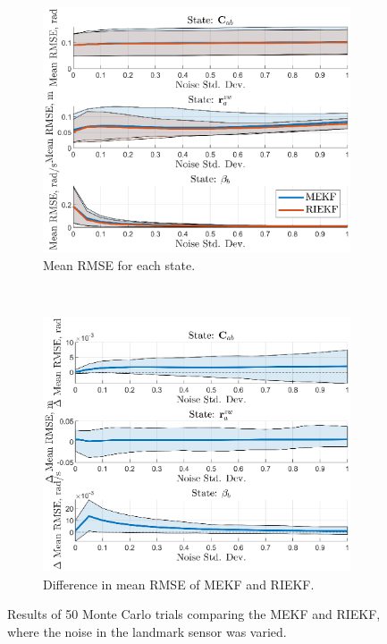 \begin{figure}
	\centering
	\begin{subfigure}[b]{0.5\textwidth}
		\includegraphics[width=\textwidth]{figs/se3/bias/comp_noise_rmse_state_Bias_Corr_R.eps}
		\caption{Mean RMSE for each state.}
	\end{subfigure}
	~
	\begin{subfigure}[b]{0.5\textwidth}
		\includegraphics[width=\textwidth]{figs/se3/bias/comp_noise_diff_state_Bias_Corr_R.eps}
		\caption{Difference in mean RMSE of MEKF and RIEKF.}
	\end{subfigure}
	\caption[Results comparing the MEKF-R and RIEKF varying landmark sensor noise.]{Results of 50 Monte Carlo trials comparing the MEKF and RIEKF, where the noise in the landmark sensor was varied.}
	\label{fig:se3_comp_bias_corr}
\end{figure} 


